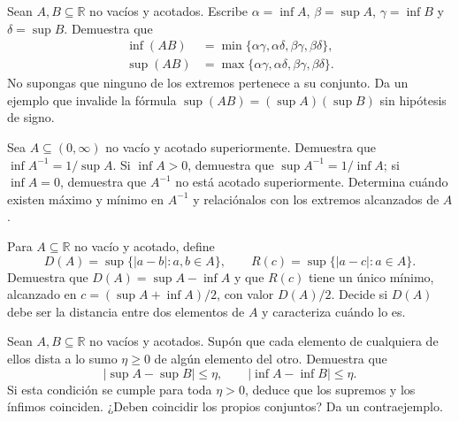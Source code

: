 \begin{samepage}
\begin{problem}\label{prob:reto-extremos-02}
Sean $A,B\subseteq\mathbb R$ no vacíos y acotados. Escribe $\alpha=\inf A$, $\beta=\sup A$, $\gamma=\inf B$ y $\delta=\sup B$. Demuestra que
\[
\begin{aligned}
\inf(AB)&=\min\{\alpha\gamma,\alpha\delta,\beta\gamma,\beta\delta\},\\
\sup(AB)&=\max\{\alpha\gamma,\alpha\delta,\beta\gamma,\beta\delta\}.
\end{aligned}
\]
No supongas que ninguno de los extremos pertenece a su conjunto. Da un ejemplo que invalide la fórmula $\sup(AB)=(\sup A)(\sup B)$ sin hipótesis de signo.~\cite{mseProducto}
\end{problem}
\end{samepage}
\par{}

\begin{samepage}
\begin{problem}\label{prob:reto-extremos-03}
Sea $A\subseteq(0,\infty)$ no vacío y acotado superiormente. Demuestra que $\inf A^{-1}=1/\sup A$. Si $\inf A>0$, demuestra que $\sup A^{-1}=1/\inf A$; si $\inf A=0$, demuestra que $A^{-1}$ no está acotado superiormente. Determina cuándo existen máximo y mínimo en $A^{-1}$ y relaciónalos con los extremos alcanzados de $A$.
\end{problem}
\end{samepage}
\par{}

\begin{samepage}
\begin{problem}\label{prob:reto-extremos-04}
Para $A\subseteq\mathbb R$ no vacío y acotado, define
\[
D(A)=\sup\{|a-b|:a,b\in A\},\qquad
R(c)=\sup\{|a-c|:a\in A\}.
\]
Demuestra que $D(A)=\sup A-\inf A$ y que $R(c)$ tiene un único mínimo, alcanzado en $c=(\sup A+\inf A)/2$, con valor $D(A)/2$. Decide si $D(A)$ debe ser la distancia entre dos elementos de $A$ y caracteriza cuándo lo es.
\end{problem}
\end{samepage}
\par{}

\begin{samepage}
\begin{problem}\label{prob:reto-extremos-05}
Sean $A,B\subseteq\mathbb R$ no vacíos y acotados. Supón que cada elemento de cualquiera de ellos dista a lo sumo $\eta\ge0$ de algún elemento del otro. Demuestra que
\[
|\sup A-\sup B|\le\eta,\qquad
|\inf A-\inf B|\le\eta.
\]
Si esta condición se cumple para toda $\eta>0$, deduce que los supremos y los ínfimos coinciden. ¿Deben coincidir los propios conjuntos? Da un contraejemplo.
\end{problem}
\end{samepage}
\par{}

